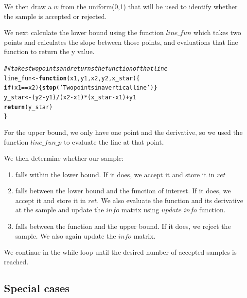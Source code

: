 \documentclass{article}\usepackage[]{graphicx}\usepackage[]{color}
\makeatletter
\newcommand{\hlstr}[1]{\textcolor[rgb]{0.192,0.494,0.8}{#1}}%
\newcommand{\hlcom}[1]{\textcolor[rgb]{0.678,0.584,0.686}{\textit{#1}}}%
\newcommand{\hlopt}[1]{\textcolor[rgb]{0,0,0}{#1}}%
\newcommand{\hlstd}[1]{\textcolor[rgb]{0.345,0.345,0.345}{#1}}%
\newcommand{\hlkwa}[1]{\textcolor[rgb]{0.161,0.373,0.58}{\textbf{#1}}}%
\newcommand{\hlkwb}[1]{\textcolor[rgb]{0.69,0.353,0.396}{#1}}%
\newcommand{\hlkwc}[1]{\textcolor[rgb]{0.333,0.667,0.333}{#1}}%
\newcommand{\hlkwd}[1]{\textcolor[rgb]{0.737,0.353,0.396}{\textbf{#1}}}%
\newenvironment{kframe}{%
 \def\at@end@of@kframe{}%
 \ifinner\ifhmode%
  \def\at@end@of@kframe{\end{minipage}}%
  \begin{minipage}{\columnwidth}%
 \fi\fi%
 \def\FrameCommand##1{\hskip\@totalleftmargin \hskip-\fboxsep
 \colorbox{shadecolor}{##1}\hskip-\fboxsep
     \hskip-\linewidth \hskip-\@totalleftmargin \hskip\columnwidth}%
 \MakeFramed {\advance\hsize-\width
   \@totalleftmargin\z@ \linewidth\hsize
   \@setminipage}}%
 {\par\unskip\endMakeFramed%
 \at@end@of@kframe}
\newenvironment{knitrout}{}{} %
\makeatother
\begin{document}
We then draw a $w$ from the uniform(0,1) that will be used to identify
whether the sample is accepted or rejected.

We next calculate the lower bound using the function $line\_fun$ which
takes two points and calculates the slope between those points, and
evaluations that line function to return the y value.

\begin{knitrout}
\color{fgcolor}\begin{kframe}
\begin{alltt}
\hlcom{## takes two points and returns the function of that line}
\hlstd{line_fun} \hlkwb{<-} \hlkwa{function}\hlstd{(}\hlkwc{x1}\hlstd{,} \hlkwc{y1}\hlstd{,} \hlkwc{x2}\hlstd{,} \hlkwc{y2}\hlstd{,} \hlkwc{x_star}\hlstd{)\{}
  \hlkwa{if}\hlstd{(x1} \hlopt{==} \hlstd{x2) \{}\hlkwd{stop}\hlstd{(}\hlstr{'Two points in a vertical line'}\hlstd{)\}}
  \hlstd{y_star} \hlkwb{<-} \hlstd{(y2} \hlopt{-} \hlstd{y1)}\hlopt{/}\hlstd{(x2} \hlopt{-} \hlstd{x1)}\hlopt{*}\hlstd{(x_star} \hlopt{-} \hlstd{x1)} \hlopt{+} \hlstd{y1}
  \hlkwd{return}\hlstd{(y_star)}
\hlstd{\}}
\end{alltt}
\end{kframe}
\end{knitrout}

For the upper bound, we only have one point and the derivative,
so we used the function $line\_fun\_p$ to evaluate the line at that
point.

We then determine whether our sample:
\begin{enumerate}
\item falls within the lower bound. If it does, we accept it and store
it in $ret$
\item falls between the lower bound and the function of interest.  If
it does, we accept it and store it in $ret$. We also evaluate the
function and its derivative at the sample and update the $info$ matrix
using $update\_info$ function.
\item falls between the function and the upper bound. If it does, we
reject the sample. We also again update the $info$ matrix.
\end{enumerate}

We continue in the while loop until the desired number of accepted
samples is reached. 

\subsection{Special cases}
\end{document}
